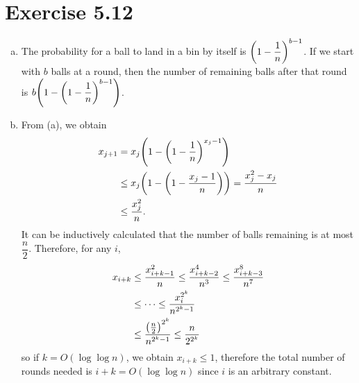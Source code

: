 \documentclass{article}
\begin{document}
\section*{Exercise 5.12}
\begin{enumerate}[(a)]
    \item The probability for a ball to land in a bin by itself is $\qty(1 - \dfrac{1}{n})^{b-1}$.
    If we start with $b$ balls at a round, then the number of remaining balls after that round is $b\qty(1 - \qty(1 - \dfrac{1}{n})^{b-1})$.
    \item From (a), we obtain
    \begin{align*}
        x_{j+1} &= x_j\qty(1 - \qty(1 - \frac{1}{n})^{x_j-1}) \\
        &\leq x_j\qty(1 - \qty(1 - \frac{x_j-1}{n})) = \frac{x_j^2 - x_j}{n} \\
        &\leq \frac{x_j^2}{n}.
    \end{align*}
    It can be inductively calculated that the number of balls remaining is at most $\dfrac{n}{2}$.
    Therefore, for any $i$,
    \begin{align*}
        x_{i+k} &\leq \frac{x_{i+k-1}^2}{n} \leq \frac{x_{i+k-2}^4}{n^3} \leq \frac{x_{i+k-3}^8}{n^7} \\
        &\leq \cdots \leq \frac{x_i^{2^k}}{n^{2^k-1}} \\
        &\leq \frac{\qty(\frac{n}{2})^{2^k}}{n^{2^k-1}} \leq \frac{n}{2^{2^k}}
    \end{align*}
    so if $k = O(\log\log{n})$, we obtain $x_{i+k} \leq 1$, therefore the total number of rounds needed is $i+k = O(\log\log{n})$ since $i$ is an arbitrary constant.
\end{enumerate}
\end{document}
